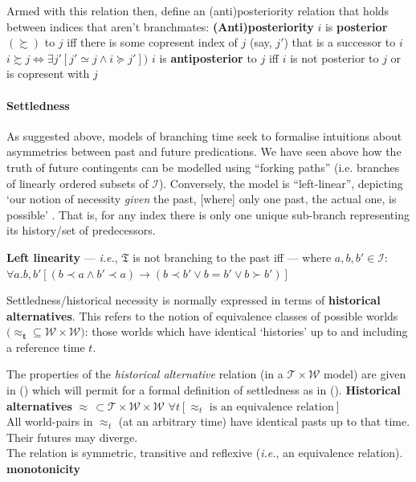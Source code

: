 \documentclass[11pt,dvipsnames]{report}
\begin{document}
Armed with this relation then, \citeauthor{Thomason1980} define an (anti)posteriority relation that holds between indices that aren't branchmates:
\pex \textbf{(Anti)posteriority} \citep[311]{Thomason1980}
\a $ i $ is \textbf{posterior} $ (\boldsymbol\succsim )$ to $ j $ iff there is some copresent index of $ j $ (say, $ j' $) that is a successor to $ i $ \hfill
$i \boldsymbol\succsim j\Leftrightarrow\exists j'[j'\simeq j\wedge i\succcurlyeq j'] )$
\a $ i $ is \textbf{antiposterior} to $ j $ iff $ i $ is not posterior to $ j $ or is copresent with $ j $ \\
\xe

\paragraph{Settledness} As suggested above, models of branching time seek to formalise intuitions about asymmetries between past and future predications. We have seen above how the truth of future contingents can be modelled using ``forking paths'' (i.e. branches of linearly ordered subsets of $ \mathcal I $). Conversely, the model is ``left-linear'', depicting `our notion of necessity \textit{given} the past, [where] only one past, the actual one, is possible' \citep[159]{Burgess1978}. That is, for any index there is only one unique sub-branch representing its history/set of predecessors.\label{par:settledness}

\ex {} \textbf{Left linearity }--- \textit{i.e.}, $ \mathfrak T $ is not branching to the past iff --- where $ a,b,b'\in\mathcal I: $\\
$ \forall a.b,b'[(b\prec a\wedge b'\prec a)\to(b\prec b'\vee b=b'\vee b\succ b')] $\xe

Settledness/historical necessity is normally expressed in terms of \textbf{historical alternatives}. This refers to the notion of equivalence classes of possible worlds $\boldsymbol{(\approx_{t}}\subseteq\mathcal{W\times W})$: those worlds which have identical `histories' up to and including a reference time $t$. 

The properties of the \textit{historical alternative} relation (in a $ \mathcal{T\times W} $ model) are given in (\nextx) which will permit for a formal definition of settledness as in (\anextx).
	\pex \textbf{Historical alternatives} $\boldsymbol\approx\,\subset\mathcal{T\times W\times W}$
	\a $\forall t[\approx_t\text{ is an equivalence relation}]$\\
	All world-pairs in $\approx_t$ (at an arbitrary time) have identical pasts up to that time.\\Their futures may diverge.\\
	The relation is symmetric, transitive and reflexive (\textit{i.e.}, an equivalence relation).
	\a \textbf{monotonicity}
	
\end{document}
